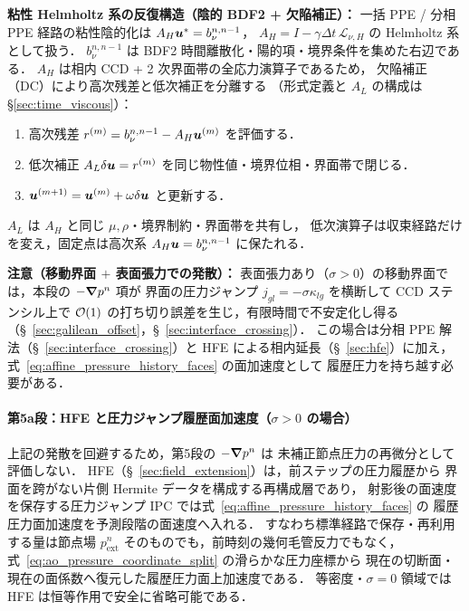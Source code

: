 \medskip
\noindent\textbf{粘性 Helmholtz 系の反復構造（陰的 BDF2 + 欠陥補正）：}
一括 PPE / 分相 PPE 経路の粘性陰的化は
$A_H\bm{u}^*=b_\nu^{n,n-1}$，
$A_H=I-\gamma\Delta t\,\mathcal{L}_{\nu,H}$ の Helmholtz 系として扱う．
$b_\nu^{n,n-1}$ は BDF2 時間離散化・陽的項・境界条件を集めた右辺である．
$A_H$ は相内 CCD + 2 次界面帯の全応力演算子であるため，
欠陥補正（DC）により高次残差と低次補正を分離する
（形式定義と $A_L$ の構成は §\ref{sec:time_viscous}）：
\begin{enumerate}[noitemsep,leftmargin=2em]
  \item 高次残差 $r^{(m)} = b_\nu^{n,n-1} - A_H\bm{u}^{(m)}$ を評価する．
  \item 低次補正 $A_L\delta\bm{u} = r^{(m)}$ を同じ物性値・境界位相・界面帯で閉じる．
  \item $\bm{u}^{(m+1)} = \bm{u}^{(m)} + \omega\delta\bm{u}$ と更新する．
\end{enumerate}
$A_L$ は $A_H$ と同じ $\mu,\rho$・境界制約・界面帯を共有し，
低次演算子は収束経路だけを変え，固定点は高次系 $A_H\bm{u}=b_\nu^{n,n-1}$ に保たれる．

\noindent\textbf{注意（移動界面 $+$ 表面張力での発散）：}
表面張力あり（$\sigma > 0$）の移動界面では，本段の $-\bm{\nabla} p^n$ 項が
界面の圧力ジャンプ $j_{gl}=-\sigma\kappa_{lg}$ を横断して CCD ステンシル上で
$\mathcal{O}(1)$ の打ち切り誤差を生じ，有限時間で不安定化し得る
（§~\ref{sec:galilean_offset}，§~\ref{sec:interface_crossing}）．
この場合は分相 PPE 解法（§~\ref{sec:interface_crossing}）と
HFE による相内延長（§~\ref{sec:hfe}）に加え，
式~\eqref{eq:affine_pressure_history_faces} の面加速度として
履歴圧力を持ち越す必要がある．

\paragraph{第5a段：HFE と圧力ジャンプ履歴面加速度（$\sigma > 0$ の場合）}
上記の発散を回避するため，第5段の $-\bm{\nabla} p^n$ は
未補正節点圧力の再微分として評価しない．
HFE（§~\ref{sec:field_extension}）は，前ステップの圧力履歴から
界面を跨がない片側 Hermite データを構成する再構成層であり，
射影後の面速度を保存する圧力ジャンプ IPC では式~\eqref{eq:affine_pressure_history_faces} の
履歴圧力面加速度を予測段階の面速度へ入れる．
すなわち標準経路で保存・再利用する量は節点場
$p^n_{\mathrm{ext}}$ そのものでも，前時刻の幾何毛管反力でもなく，
式~\eqref{eq:ao_pressure_coordinate_split} の滑らかな圧力座標から
現在の切断面・現在の面係数へ復元した履歴圧力面上加速度である．
等密度・$\sigma=0$ 領域では HFE は恒等作用で安全に省略可能である．

